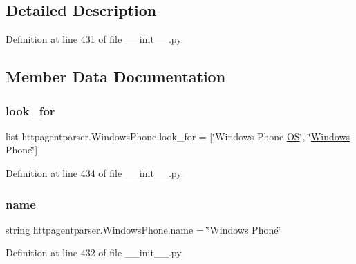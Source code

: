 \subsection{Detailed Description}


Definition at line 431 of file \+\_\+\+\_\+init\+\_\+\+\_\+.\+py.



\subsection{Member Data Documentation}
\hypertarget{classhttpagentparser_1_1_windows_phone_aa2cb58b0def9fcaedd2098b974038364}{}\label{classhttpagentparser_1_1_windows_phone_aa2cb58b0def9fcaedd2098b974038364} 
\subsubsection{\texorpdfstring{look\+\_\+for}{look\_for}}
{\footnotesize\ttfamily list httpagentparser.\+Windows\+Phone.\+look\+\_\+for = \mbox{[}\char`\"{}Windows Phone \hyperlink{classhttpagentparser_1_1_o_s}{OS}\char`\"{}, \char`\"{}\hyperlink{classhttpagentparser_1_1_windows}{Windows} Phone\char`\"{}\mbox{]}\hspace{0.3cm}{\ttfamily [static]}}



Definition at line 434 of file \+\_\+\+\_\+init\+\_\+\+\_\+.\+py.

\hypertarget{classhttpagentparser_1_1_windows_phone_a7c794db7c90aa462a523f6cdf89086d2}{}\label{classhttpagentparser_1_1_windows_phone_a7c794db7c90aa462a523f6cdf89086d2} 
\subsubsection{\texorpdfstring{name}{name}}
{\footnotesize\ttfamily string httpagentparser.\+Windows\+Phone.\+name = \char`\"{}Windows Phone\char`\"{}\hspace{0.3cm}{\ttfamily [static]}}



Definition at line 432 of file \+\_\+\+\_\+init\+\_\+\+\_\+.\+py.

